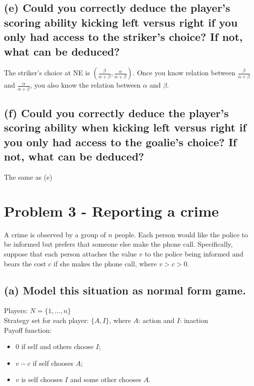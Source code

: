 \documentclass{article}
\begin{document}
\subsection*{(e) Could you correctly deduce the player's scoring ability kicking left versus right if you only had access to the striker's choice? If not, what can be deduced?}

The striker's choice at NE is $(\tfrac{\beta}{\alpha + \beta},\tfrac{\alpha}{\alpha + \beta})$.
Once you know relation between $\tfrac{\beta}{\alpha + \beta}$ and $\tfrac{\alpha}{\alpha + \beta}$, you also know the relation between $\alpha$ and $\beta $.


\subsection*{(f) Could you correctly deduce the player's scoring ability when kicking left versus right if you only had access to the goalie's choice? If not, what can be deduced?}

The same as (e)


\newpage

\section{Problem 3 - Reporting a crime}

A crime is observed by a group of $n$ people. Each person would like the police to be informed
but prefers that someone else make the phone call. Specifically, suppose that each person
attaches the value $v$ to the police being informed and bears the cost $c$ if she makes the
phone call, where $v > c > 0$.

\subsection*{(a) Model this situation as normal form game.}  


 Players: $N = \{1, \dots , n \}$ \\ 
 Strategy set for each player: $\{A, I \}$, where $A$: action and $I$: inaction \\ 
 Payoff function: 

\begin{itemize}
\item $0$ if self and others choose $I$; 
\item $v-c$ if self chooses $A$; 
\item $v$ is self chooses $I$ and some other chooses $A$.
\end{itemize}
\end{document}
